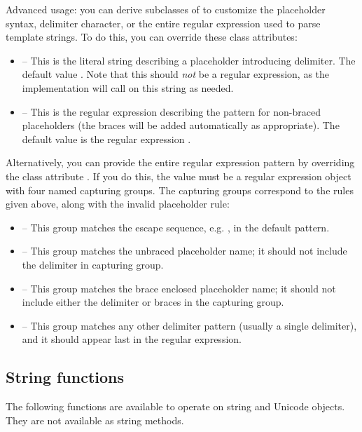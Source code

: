 Advanced usage: you can derive subclasses of  to customize the
placeholder syntax, delimiter character, or the entire regular expression used
to parse template strings.  To do this, you can override these class
attributes:

\begin{itemize}
\item {} -- This is the literal string describing a placeholder
      introducing delimiter.  The default value \samp{\$}.  Note that this
      should \emph{not} be a regular expression, as the implementation will
      call  on this string as needed.
\item {} -- This is the regular expression describing the pattern
      for non-braced placeholders (the braces will be added automatically as
      appropriate).  The default value is the regular expression
      \samp{[_a-z][_a-z0-9]*}.
\end{itemize}

Alternatively, you can provide the entire regular expression pattern by
overriding the class attribute .  If you do this, the value must
be a regular expression object with four named capturing groups.  The
capturing groups correspond to the rules given above, along with the invalid
placeholder rule:

\begin{itemize}
\item {} -- This group matches the escape sequence,
      e.g. \samp{\$\$}, in the default pattern.
\item {} -- This group matches the unbraced placeholder name; it
      should not include the delimiter in capturing group.
\item {} -- This group matches the brace enclosed placeholder name;
      it should not include either the delimiter or braces in the capturing
      group.
\item {} -- This group matches any other delimiter pattern (usually
      a single delimiter), and it should appear last in the regular
      expression.
\end{itemize}

\subsection{String functions}

The following functions are available to operate on string and Unicode
objects.  They are not available as string methods.

